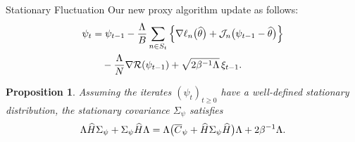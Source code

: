 \documentclass[10pt,xcolor=table]{beamer}
\newtheorem{proposition}{Proposition}
\begin{document}
\begin{frame}{Stationary Fluctuation}
Our new proxy algorithm update as follows:
\begin{equation}
	\begin{aligned}
		\psi_{t} &= \psi_{t-1} -\frac{\Lambda}{B} \sum_{n \in S_{t}} \left\lbrace \nabla \ell_{n}\big(\widehat{\theta}\big) +\mathcal{J}_{n} \big(\psi_{t-1}-\widehat{\theta}\big)\right\rbrace \\
		&\quad - \frac{\Lambda}{N} \nabla \mathcal{R}(\psi_{t-1}) + \sqrt{2\beta^{-1} \Lambda}\,\xi_{t-1}.
	\end{aligned}
	\label{eq: proxy discrete-time update for general loss}
\end{equation}
	\begin{proposition} \label{thm:SGLD-stationary-covariance} 
		Assuming the iterates $(\psi_{t})_{t \ge 0}$ have a well-defined stationary distribution, the stationary covariance $\Sigma_{\psi}$ satisfies 
		\begin{equation*}
			\Lambda \widehat{H} \Sigma_{\psi} + \Sigma_{\psi}  \widehat{H} \Lambda = \Lambda \big(\overline{C}_{\psi} + \widehat{H} \Sigma_{\psi} \widehat{H} \big)\Lambda + 2\beta^{-1}\Lambda.
			\label{eq: SGLD stationary covariance}
		\end{equation*}
	\end{proposition}
	
\end{frame}
\end{document}
